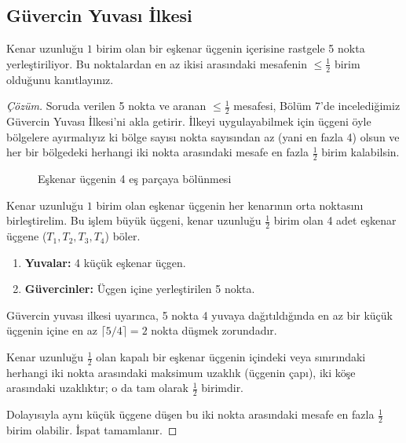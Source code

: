 \subsection{Güvercin Yuvası İlkesi}

\begin{example}
Kenar uzunluğu $1$ birim olan bir eşkenar üçgenin içerisine rastgele 5 nokta yerleştiriliyor. Bu noktalardan en az ikisi arasındaki mesafenin $\le \frac{1}{2}$ birim olduğunu kanıtlayınız.
\end{example}

\begin{proof}[Çözüm]
Soruda verilen 5 nokta ve aranan $\le \frac{1}{2}$ mesafesi, Bölüm 7'de incelediğimiz Güvercin Yuvası İlkesi'ni akla getirir. İlkeyi uygulayabilmek için üçgeni öyle bölgelere ayırmalıyız ki bölge sayısı nokta sayısından az (yani en fazla 4) olsun ve her bir bölgedeki herhangi iki nokta arasındaki mesafe en fazla $\frac{1}{2}$ birim kalabilsin.

\begin{figure}[htbp]
\centering
{}
\caption{Eşkenar üçgenin 4 eş parçaya bölünmesi}
\end{figure}

Kenar uzunluğu $1$ birim olan eşkenar üçgenin her kenarının orta noktasını birleştirelim. Bu işlem büyük üçgeni, kenar uzunluğu $\frac{1}{2}$ birim olan 4 adet eşkenar üçgene ($T_1, T_2, T_3, T_4$) böler.

\begin{enumerate}
    \item \textbf{Yuvalar:} 4 küçük eşkenar üçgen.
    \item \textbf{Güvercinler:} Üçgen içine yerleştirilen 5 nokta.
\end{enumerate}

Güvercin yuvası ilkesi uyarınca, 5 nokta 4 yuvaya dağıtıldığında en az bir küçük üçgenin içine en az $\lceil 5/4 \rceil = 2$ nokta düşmek zorundadır.

Kenar uzunluğu $\frac{1}{2}$ olan kapalı bir eşkenar üçgenin içindeki veya sınırındaki herhangi iki nokta arasındaki maksimum uzaklık (üçgenin çapı), iki köşe arasındaki uzaklıktır; o da tam olarak $\frac{1}{2}$ birimdir.

Dolayısıyla aynı küçük üçgene düşen bu iki nokta arasındaki mesafe en fazla $\frac{1}{2}$ birim olabilir. İspat tamamlanır.
\end{proof}

